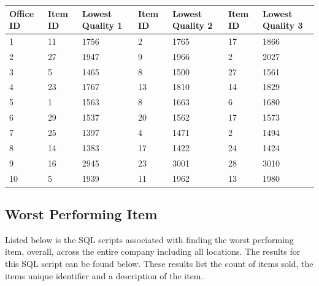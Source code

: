 \documentclass{article}
\begin{document}
            \begin{table}[H]
                \centering
                \begin{tabular}{|l|l|l|l|l|l|l|}
                \hline
                Office ID & Item ID & Lowest Quality 1 & Item ID & Lowest Quality 2 & Item ID & Lowest Quality 3  \\ \hline
                1         & 11      & 1756             & 2       & 1765             & 17      & 1866              \\ \hline
                2         & 27      & 1947             & 9       & 1966             & 2       & 2027              \\ \hline
                3         & 5       & 1465             & 8       & 1500             & 27      & 1561              \\ \hline
                4         & 23      & 1767             & 13      & 1810             & 14      & 1829              \\ \hline
                5         & 1       & 1563             & 8       & 1663             & 6       & 1680              \\ \hline
                6         & 29      & 1537             & 20      & 1562             & 17      & 1573              \\ \hline
                7         & 25      & 1397             & 4       & 1471             & 2       & 1494              \\ \hline
                8         & 14      & 1383             & 17      & 1422             & 24      & 1424              \\ \hline
                9         & 16      & 2945             & 23      & 3001             & 28      & 3010              \\ \hline
                10        & 5       & 1939             & 11      & 1962             & 13      & 1980              \\ \hline
                \end{tabular}
                \end{table}

\newpage

            \subsection{Worst Performing Item}
            
                Listed below is the SQL scripts associated with finding the worst performing item, overall, across the entire company including all locations. The results for this SQL script can be found below. These results list the count of items sold, the items unique identifier and a description of the item. \\
\end{document}
